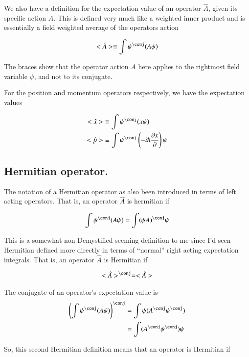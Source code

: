 \documentclass{article}
\begin{document}
We also have a definition for the expectation value
of an operator $\hat{A}$, given its specific action $A$.
This is defined very much like a weighted inner product
and is essentially a field weighted average of the operators action

\begin{align*}
<\hat{A}> \equiv \int \psi^\conj (A \psi)
\end{align*}

The braces show that the operator action $A$ here applies to the rightmost field variable $\psi$, and not to its conjugate.

For the position and momentum operators respectively, we have the
expectation values

\begin{align*}
<\hat{x}> &\equiv \int \psi^\conj (x \psi) \\
<\hat{p}> &\equiv \int \psi^\conj \left(-i \hbar \PD{x}{}\right) \psi
\end{align*}

\subsection{ Hermitian operator. }

The notation of a Hermitian operator as also been introduced in terms of 
left acting operators.  That is, an operator $\hat{A}$ is hermitian if

\begin{align}\label{eqn:hermitian1}
\int \psi^\conj (A \psi) = \int (\psi A)^\conj \psi
\end{align}

This is a somewhat non-Demystified seeming definition to me since I'd seen
Hermitian defined more directly in terms of ``normal'' right acting 
expectation integrals.  That is, an operator $\hat{A}$ is Hermitian if

\begin{align*}
<\hat{A}>^\conj = <\hat{A}>
\end{align*}

The conjugate of an operator's expectation value is
\begin{align*}
\left(\int \psi^\conj (A \psi)\right)^\conj 
&= \int \psi (A^\conj \psi^\conj) \\
&= \int (A^\conj \psi^\conj) \psi \\
\end{align*}

So, this second Hermitian definition means that an operator is Hermitian if
\end{document}
